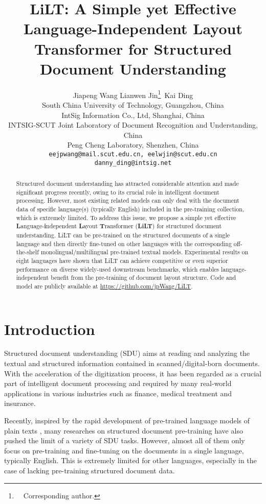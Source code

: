 \documentclass[11pt]{article}
\title{LiLT: A Simple yet Effective Language-Independent Layout Transformer for Structured Document Understanding}
\author{Jiapeng Wang \qquad  Lianwen Jin\thanks{\ \ Corresponding author.}\   \qquad  Kai Ding \\
South China University of Technology, Guangzhou, China\\
IntSig Information Co.,  Ltd, Shanghai, China\\
INTSIG-SCUT Joint Laboratory of Document Recognition and Understanding, China\\
Peng Cheng Laboratory, Shenzhen, China\\
\texttt{eejpwang@mail.scut.edu.cn,  eelwjin@scut.edu.cn} \\
\texttt{danny\_ding@intsig.net}\\
}
\begin{document}
\maketitle
\begin{abstract}
Structured document understanding has attracted considerable attention and made significant progress recently, owing to its crucial role in intelligent document  processing. However, most existing related models can only  deal with the  document data of specific language(s)  (typically English) included in the pre-training collection,  which is extremely limited. To address this issue, we propose a simple yet effective \textbf{L}anguage-\textbf{i}ndependent \textbf{L}ayout \textbf{T}ransformer (\textbf{LiLT}) for structured 
document understanding. LiLT can be pre-trained on the structured documents of a single language and  then directly fine-tuned on other  languages with the corresponding off-the-shelf monolingual/multilingual pre-trained textual models. Experimental results on eight languages have shown that LiLT  can achieve  competitive or even superior performance on diverse widely-used downstream benchmarks, which enables language-independent benefit from the pre-training of document layout structure. Code and model 
are publicly available at  \href{https://github.com/jpWang/LiLT}{https://github.com/jpWang/LiLT}.
\end{abstract}


\section{Introduction}
Structured document understanding (SDU) aims at reading and analyzing the textual and structured information contained in scanned/digital-born documents. 
With the acceleration of the digitization process, it has been regarded as a crucial part of  intelligent document  processing and required by many real-world  applications in various industries such as finance, medical treatment and  insurance.

Recently, inspired by the rapid development of pre-trained language
models of plain texts \cite{devlin2019bert,liu2019roberta,bao2020unilmv2,chi2021infoxlm},
 many researches  on structured document  pre-training \cite{Layoutlm,layoutlmv2,xu2021layoutxlm,li2021structurallm,li2021selfdoc,li2021structext,appalaraju2021docformer}  have also pushed the limit of a variety of SDU tasks.
However, almost  all of them only focus on pre-training and fine-tuning on the documents in a single language, typically English. This is extremely limited for  other languages, especially in the case of lacking pre-training structured document data.
\end{document}
